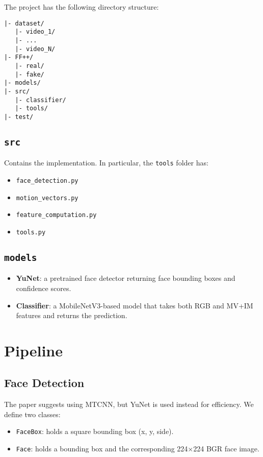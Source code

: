 \documentclass[a4paper,12pt]{article}
\begin{document}
The project has the following directory structure:

\begin{verbatim}
|- dataset/
   |- video_1/
   |- ...
   |- video_N/
|- FF++/
   |- real/
   |- fake/
|- models/
|- src/
   |- classifier/
   |- tools/
|- test/
\end{verbatim}

\subsection{\texttt{src}}

Contains the implementation. In particular, the \texttt{tools} folder has:
\begin{itemize}
  \item \texttt{face\_detection.py}
  \item \texttt{motion\_vectors.py}
  \item \texttt{feature\_computation.py}
  \item \texttt{tools.py}
\end{itemize}

\subsection{\texttt{models}}

\begin{itemize}
  \item \textbf{YuNet}: a pretrained face detector returning face bounding boxes and confidence scores.
  \item \textbf{Classifier}: a MobileNetV3-based model that takes both RGB and MV+IM features and returns the prediction.
\end{itemize}

\section{Pipeline}

\subsection{Face Detection}

The paper suggests using MTCNN, but YuNet is used instead for efficiency. We define two classes:
\begin{itemize}
  \item \texttt{FaceBox}: holds a square bounding box (x, y, side).
  \item \texttt{Face}: holds a bounding box and the corresponding 224×224 BGR face image.
\end{itemize}
\end{document}
